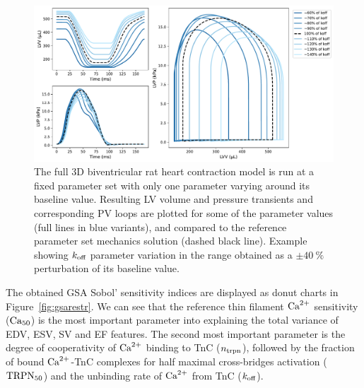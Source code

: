 \begin{figure}[h!]
    \myfloatalign
    \includegraphics[width=\textwidth]{figures/chapter08/Fig2.pdf}
    \caption{The full $3$D biventricular rat heart contraction model is run at a fixed parameter set with only one parameter varying around its baseline value. Resulting LV volume and pressure transients and corresponding PV loops are plotted for some of the parameter values (full lines in blue variants), and compared to the reference parameter set mechanics solution (dashed black line). Example showing $k_{\textrm{off}}$ parameter variation in the range obtained as a $\pm\SI{40}{\percent}$ perturbation of its baseline value.}
    \label{fig:EFvskoff}
\end{figure}

\vspace{0.2cm}
The obtained GSA Sobol' sensitivity indices are displayed as donut charts in Figure~\ref{fig:gsarestr}. We can see that the reference thin filament $\textrm{Ca}^{2+}$ sensitivity ($\textrm{Ca}_{50}$) is the most important parameter into explaining the total variance of EDV, ESV, SV and EF features. The second most important parameter is the degree of cooperativity of $\textrm{Ca}^{2+}$ binding to TnC ($n_{\textrm{trpn}}$), followed by the fraction of bound $\textrm{Ca}^{2+}$-TnC complexes for half maximal cross-bridges activation ($\textrm{TRPN}_{50}$) and the unbinding rate of $\textrm{Ca}^{2+}$ from TnC ($k_{\textrm{off}}$).

